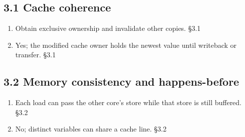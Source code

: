 \documentclass[11pt]{article}
\begin{document}
\begin{keepsection}\subsection{3.1 Cache coherence}

\begin{enumerate}
\item Obtain exclusive ownership and invalidate other copies. \hfill{\small\color{FAUblue}§3.1}
\item Yes; the modified cache owner holds the newest value until writeback or transfer. \hfill{\small\color{FAUblue}§3.1}
\end{enumerate}

\end{keepsection}
\begin{keepsection}\subsection{3.2 Memory consistency and happens-before}

\begin{enumerate}
\item Each load can pass the other core’s store while that store is still buffered. \hfill{\small\color{FAUblue}§3.2}
\item No; distinct variables can share a cache line. \hfill{\small\color{FAUblue}§3.2}
\end{enumerate}

\end{keepsection}
\end{document}
